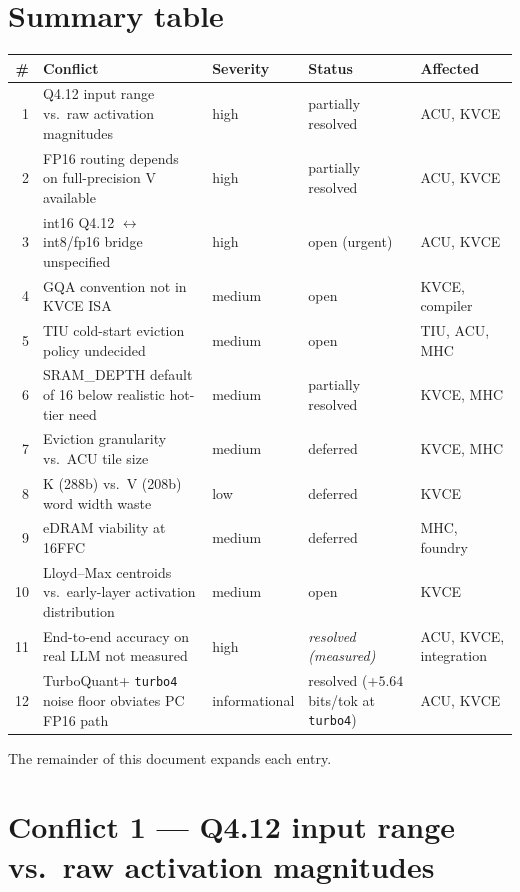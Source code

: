 \documentclass[11pt]{article}
\begin{document}
\section{Summary table}

\begin{center}
\renewcommand{\arraystretch}{1.2}
\setlength{\tabcolsep}{4pt}
\begin{tabular}{@{}rp{}lll@{}}
\toprule
\textbf{\#} & \textbf{Conflict} & \textbf{Severity} & \textbf{Status} & \textbf{Affected} \\
\midrule
1 & Q4.12 input range vs.\ raw activation magnitudes
  & high   & partially resolved & ACU, KVCE \\
2 & FP16 routing depends on full-precision V available
  & high   & partially resolved & ACU, KVCE \\
3 & int16 Q4.12 $\leftrightarrow$ int8/fp16 bridge unspecified
  & high   & open (urgent) & ACU, KVCE \\
4 & GQA convention not in KVCE ISA
  & medium & open & KVCE, compiler \\
5 & TIU cold-start eviction policy undecided
  & medium & open & TIU, ACU, MHC \\
6 & SRAM\_DEPTH default of 16 below realistic hot-tier need
  & medium & partially resolved & KVCE, MHC \\
7 & Eviction granularity vs.\ ACU tile size
  & medium & deferred & KVCE, MHC \\
8 & K (288b) vs.\ V (208b) word width waste
  & low    & deferred & KVCE \\
9 & eDRAM viability at 16FFC
  & medium & deferred & MHC, foundry \\
10 & Lloyd--Max centroids vs.\ early-layer activation distribution
  & medium & open & KVCE \\
11 & End-to-end accuracy on real LLM not measured
  & high   & \textit{resolved (measured)} & ACU, KVCE, integration \\
12 & TurboQuant+ \texttt{turbo4} noise floor obviates PC FP16 path
  & informational & resolved (+$5.64$ bits/tok at \texttt{turbo4}) & ACU, KVCE \\
\bottomrule
\end{tabular}
\end{center}

The remainder of this document expands each entry.

\section{Conflict 1 --- Q4.12 input range vs.\ raw activation magnitudes}
\label{sec:c1}
\end{document}
